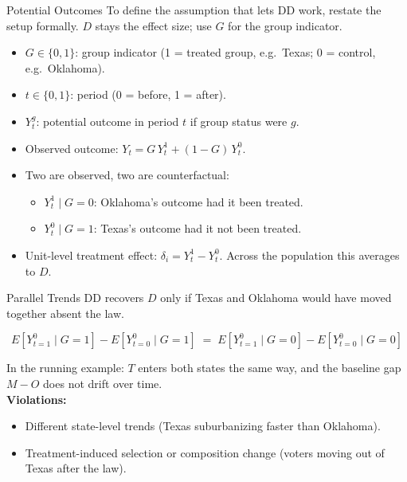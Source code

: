 \documentclass[aspectratio=169, handout]{beamer}
\numberwithin{equation}{section}
\begin{document}
\begin{frame}{Potential Outcomes}
To define the assumption that lets DD work, restate the setup formally. $D$ stays the effect size; use $G$ for the group indicator.
\begin{itemize}
\item $G\in\{0,1\}$: group indicator (1 = treated group, e.g.\ Texas; 0 = control, e.g.\ Oklahoma).
\item $t\in\{0,1\}$: period (0 = before, 1 = after).
\item $Y_t^g$: potential outcome in period $t$ if group status were $g$.
\item Observed outcome: $Y_t = G\,Y_t^1 + (1-G)\,Y_t^0$.
\item Two are observed, two are counterfactual:
\begin{itemize}
\item $Y_t^1\mid G=0$: Oklahoma's outcome had it been treated.
\item $Y_t^0\mid G=1$: Texas's outcome had it not been treated.
\end{itemize}
\item Unit-level treatment effect: $\delta_i = Y_t^1 - Y_t^0$. Across the population this averages to $D$.
\end{itemize}
\end{frame}

\begin{frame}{Parallel Trends}
DD recovers $D$ only if Texas and Oklahoma would have moved together absent the law.\\[6pt]

\begin{tcolorbox}[colback=blue!6, colframe=blue, title=Parallel trends assumption]
\centering
$$E[Y_{t=1}^0\mid G=1] - E[Y_{t=0}^0\mid G=1] \;=\; E[Y_{t=1}^0\mid G=0] - E[Y_{t=0}^0\mid G=0]$$
\end{tcolorbox}
\pause\vspace{4pt}

In the running example: $T$ enters both states the same way, and the baseline gap $M-O$ does not drift over time.\\[4pt]
\textbf{Violations:}
\begin{itemize}
\item Different state-level trends (Texas suburbanizing faster than Oklahoma).
\item Treatment-induced selection or composition change (voters moving out of Texas after the law).
\end{itemize}
\end{frame}
\end{document}
